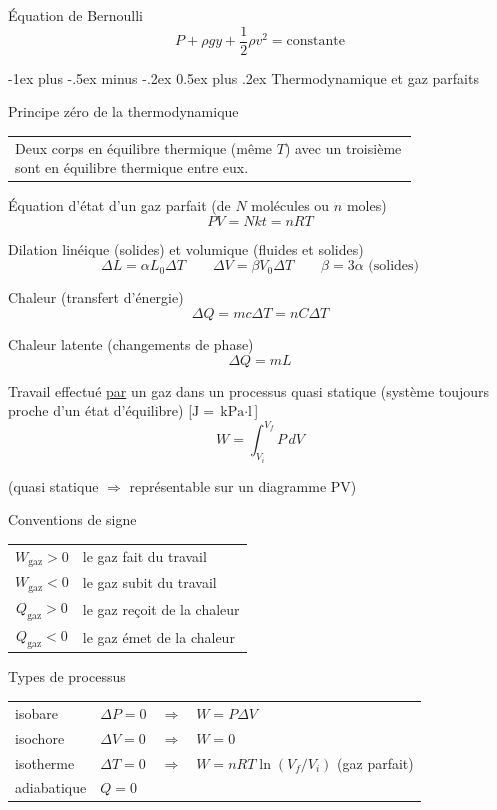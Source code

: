\documentclass[10pt,landscape]{article}
\makeatletter
\renewcommand{\section}{\@startsection{section}{1}{0mm}%
                                {-1ex plus -.5ex minus -.2ex}%
                                {0.5ex plus .2ex}%
                                {\normalfont\large\bfseries}}
\newcommand{\halfline}{\vspace{0.5em}}
\newcommand{\tableindent}{\hspace{1.5em}}
\makeatother
\begin{document}
\begin{multicols}{3}
Équation de Bernoulli
\[ P + \rho g y + \frac{1}{2}\rho v^2 = \text{constante} \]

\hrulefill


\section{Thermodynamique et gaz parfaits}

Principe zéro de la thermodynamique \\
\halfline
\begin{tabular}{@{\tableindent}p{0.8\linewidth}}
	Deux corps en équilibre thermique (même $T$) avec un troisième sont en équilibre thermique entre eux. \\
\end{tabular}
\halfline
	
Équation d'état d'un gaz parfait (de $N$ molécules ou $n$ moles)
\[ PV = Nkt = nRT \]

Dilation linéique (solides) et volumique (fluides et solides)
\[ \Delta L = \alpha L_0 \Delta T 
\qquad 
\Delta V = \beta V_0 \Delta T  \qquad  \beta = 3\alpha \text{ (solides)}
\]

Chaleur (transfert d'énergie)
\[ \Delta Q = mc\Delta T = nC\Delta T \]

Chaleur latente (changements de phase)
\[ \Delta Q = mL \]

Travail effectué \underline{par} un gaz dans un processus quasi statique (système toujours proche d'un état d'équilibre) [$\si{\joule} = \si{\kilo\pascal\cdot\litre}$]
\[ W = \int_{V_i}^{V_f} P\, dV \]

\tableindent (quasi statique $\Longrightarrow$ représentable sur un diagramme PV)
\halfline

Conventions de signe \\
\begin{tabular}{@{\tableindent}cl}
	$W_\text{gaz} > 0$ & le gaz fait du travail \\
	$W_\text{gaz} < 0$ & le gaz subit du travail \\
	$Q_\text{gaz} > 0$ & le gaz reçoit de la chaleur \\
	$Q_\text{gaz} < 0$ & le gaz émet de la chaleur \\
\end{tabular}
\halfline

Types de processus \\
\begin{tabular}{@{\tableindent}llcp{33mm}<{\raggedright}}
	isobare & $\Delta P=0$  & $ \Longrightarrow$ & $W=P\Delta V$  \\
	isochore & $\Delta V=0$  & $\Longrightarrow$ & $W=0$ \\
	isotherme & $\Delta T=0$ & $\Longrightarrow$& $W=nRT\ln(V_f/V_i)$ \scriptsize{(gaz parfait)}\\
	adiabatique & $Q=0$ & & \\
\end{tabular}
\halfline


\end{multicols}
\end{document}
